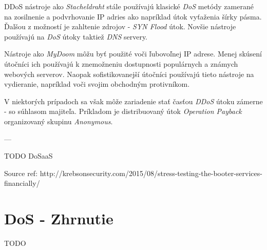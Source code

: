 \documentclass[
  printed, %
  table,   %
  lof,     %
  lot,     %
]{fithesis3}
\begin{document}
DDoS nástroje ako \textit{Stacheldraht} stále používajú klasické \textit{DoS} metódy zamerané na
zosilnenie a podvrhovanie IP adries ako napríklad útok vyťaženia šírky pásma. Ďalšou z možností je
zahltenie zdrojov - \textit{SYN Flood} útok. Novšie nástroje používajú na \textit{DoS} útoky taktiež
\textit{DNS} servery.

Nástroje ako \textit{MyDoom} môžu byť použité voči ľubovoľnej IP adrese. Menej skúsení útočníci ich
používajú k znemožneniu dostupnosti populárnych a známych webových serverov. Naopak sofistikovanejší
útočníci používajú tieto nástroje na vydieranie, napríklad voči svojim obchodným protivníkom.

V niektorých prípadoch sa však môže zariadenie stať časťou \textit{DDoS} útoku zámerne - so súhlasom
majiteľa. Príkladom je distribuovaný útok \textit{Operation Payback} organizovaný skupinu
\textit{Anonymous}.

---

TODO DoSaaS

Source ref: http://krebsonsecurity.com/2015/08/stress-testing-the-booter-services-financially/ 



\section{DoS - Zhrnutie}
TODO
\end{document}
